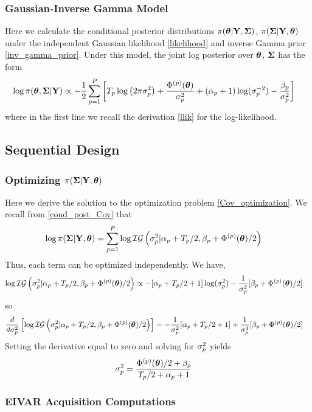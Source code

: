 \documentclass[12pt]{article}
\begin{document}
\subsubsection{Gaussian-Inverse Gamma Model}
Here we calculate the conditional posterior distributions $\pi(\boldsymbol{\theta}|\mathbf{Y}, \boldsymbol{\Sigma})$, $\pi(\boldsymbol{\Sigma}|\mathbf{Y}, \boldsymbol{\theta})$ under the independent Gaussian 
likelihood \ref{likelihood} and inverse Gamma prior \ref{inv_gamma_prior}. Under this model, the joint log posterior over $\boldsymbol{\theta}$, $\boldsymbol{\Sigma}$ has the form 
\begin{align*}
\log \pi(\boldsymbol{\theta}, \boldsymbol{\Sigma}|\mathbf{Y}) &\propto -\frac{1}{2} \sum_{p = 1}^{P} \left[T_{p} \log\left(2\pi \sigma_{p}^2 \right) + \frac{\Phi^{(p)}(\boldsymbol{\theta})}{\sigma_{p}^2}  + (\alpha_{p} + 1)\log(\sigma_{p}^{-2}) - \frac{\beta_{p}}{\sigma_{p}^2} \right]
\end{align*}
where in the first line we recall the derivation \ref{llik} for the log-likelihood. 


\subsection{Sequential Design}
\subsubsection{Optimizing $\pi(\boldsymbol{\Sigma}|\mathbf{Y}, \boldsymbol{\theta})$}
Here we derive the solution to the optimization problem \ref{Cov_optimization}. We recall from \ref{cond_post_Cov} that 
\begin{align*}
\log \pi(\boldsymbol{\Sigma}|\mathbf{Y}, \boldsymbol{\theta}) &= \sum_{p = 1}^{P} \log \mathcal{IG}\left(\sigma_{p}^2|\alpha_{p} + T_{p}/2, \beta_{p} + \Phi^{(p)}(\boldsymbol{\theta})/2 \right)
\end{align*}
Thus, each term can be optimized independently. We have, 
\begin{align*}
\log \mathcal{IG}\left(\sigma_{p}^2|\alpha_{p} + T_{p}/2, \beta_{p} + \Phi^{(p)}(\boldsymbol{\theta})/2 \right) &\propto -[\alpha_{p} + T_{p}/2 + 1]\log(\sigma^2_{p})
																									       - \frac{1}{\sigma^2_{p}} [\beta_{p} + \Phi^{(p)}(\boldsymbol{\theta})/2]
\end{align*}
so 
\begin{align*}
\frac{d}{d\sigma_{p}^2}\left[\log \mathcal{IG}\left(\sigma_{p}^2|\alpha_{p} + T_{p}/2, \beta_{p} + \Phi^{(p)}(\boldsymbol{\theta})/2 \right)\right] &= -\frac{1}{\sigma_{p}^2}[\alpha_{p} + T_{p}/2 + 1] + \frac{1}{\sigma_{p}^4} [\beta_{p} + \Phi^{(p)}(\boldsymbol{\theta})/2]
\end{align*}
Setting the derivative equal to zero and solving for $\sigma^2_{p}$ yields
\begin{align*}
\sigma_{p}^2 &= \frac{\Phi^{(p)}(\boldsymbol{\theta})/2 + \beta_{p}}{T_{p}/2 + \alpha_{p} + 1}
\end{align*}


\subsubsection{EIVAR Acquisition Computations}
\end{document}
